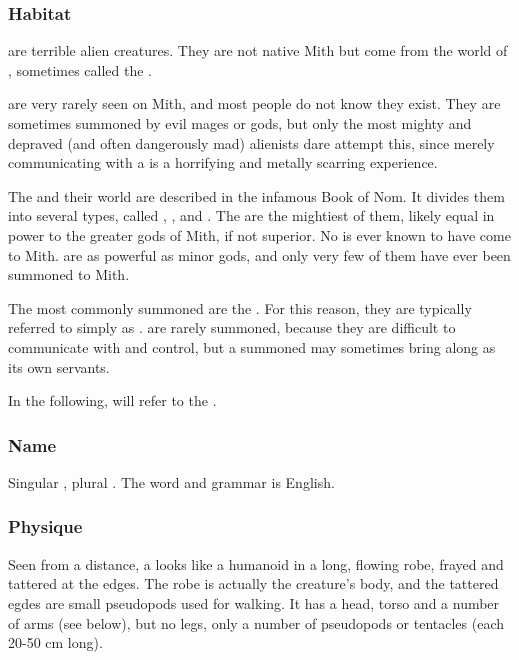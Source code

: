 \subsubsection{Habitat}



\subsectionn{\Bane{}}
\label{Bane}
\Banes{} are terrible alien creatures. They are not native Mith but come from the world of \Erebos, sometimes called the \Baneworld. 

\Banes{} are very rarely seen on Mith, and most people do not know they exist. They are sometimes summoned by evil mages or gods, but only the most mighty and depraved (and often dangerously mad) alienists dare attempt this, since merely communicating with a \bane{} is a horrifying and metally scarring experience. 

The \banes{} and their world are described in the infamous Book of Nom. It divides them into several types, called \banespawn, \baneknights, \banelords{} and \banekings. The \banekings{} are the mightiest of them, likely equal in power to the greater gods of Mith, if not superior. No \baneking{} is ever known to have come to Mith. \Banelords{} are as powerful as minor gods, and only very few of them have ever been summoned to Mith. 

The \banes{} most commonly summoned are the \baneknights{}. For this reason, they are typically referred to simply as \quo{\banes{}}. \Banespawn{} are rarely summoned, because they are difficult to communicate with and control, but a summoned \baneknight{} may sometimes bring along \banespawn{} as its own servants. 

In the following, \quo{\bane{}} will refer to the \baneknights{}. 

\subsubsection{Name}
Singular , plural \emph{\banes{}}. The word and grammar is English. 

\subsubsection{Physique}
Seen from a distance, a \bane{} looks like a humanoid in a long, flowing robe, frayed and tattered at the edges. The robe is actually the creature's body, and the tattered egdes are small pseudopods used for walking. It has a head, torso and a number of arms (see below), but no legs, only a number of pseudopods or tentacles (each 20-50 cm long).  

